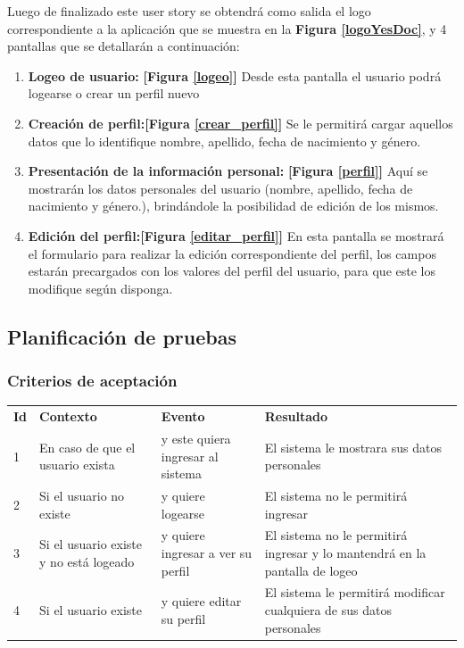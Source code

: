 Luego de finalizado este user story se obtendrá como salida el logo correspondiente a la aplicación que se muestra en la \textbf{Figura \ref{logoYesDoc}}, y 4 pantallas que se detallarán a continuación:
\begin{enumerate}
	\item \textbf{Logeo de usuario:} \textbf{[Figura \ref{logeo}]} Desde esta pantalla el usuario podrá logearse  o crear un perfil nuevo
	\item \textbf{Creación de perfil:}\textbf{[Figura \ref{crear_perfil}]} Se le permitirá cargar aquellos datos que lo identifique nombre, apellido, fecha de nacimiento y género.
    \item \textbf{Presentación de la información personal:} \textbf{[Figura \ref{perfil}]} Aquí se mostrarán los datos personales del usuario (nombre, apellido, fecha de nacimiento y género.), brindándole la posibilidad de edición de los mismos.
    \item \textbf{Edición del perfil:}\textbf{[Figura \ref{editar_perfil}]} En esta pantalla se mostrará el formulario para realizar la edición correspondiente del perfil, los campos estarán precargados con los valores del perfil del usuario, para que este los modifique según disponga.
\end{enumerate}



\clearpage	
\subsection{Planificación de pruebas}
\subsubsection{Criterios de aceptación}


\begin{center}
\begin{longtable}{|p{0.5cm}|p{4cm}|p{4cm}|p{5cm}|}
\hline \rowcolor[gray]{0.9}
	\multicolumn{4}{||c|}{\textbf{Criterio de aceptación}} \\
    \hline  \rowcolor[gray]{0.9}
        \textbf{Id} &
        \textbf{Contexto} &
        \textbf{Evento}&
        \textbf{Resultado} \\
    \hline
        1&En caso de que el usuario exista & y este quiera ingresar al sistema & El sistema le mostrara sus datos personales\\ \hline
        2 &       Si el usuario no existe & y quiere logearse & El sistema no le permitirá ingresar\\ \hline
        3 &       Si el usuario existe y no está logeado & y quiere ingresar a ver su perfil& El sistema no le permitirá ingresar y lo mantendrá en la pantalla de logeo\\ \hline
        4 &       Si el usuario existe & y quiere editar su perfil & El sistema le permitirá modificar cualquiera de sus datos personales\\ \hline
  \end{longtable}
\end{center}

